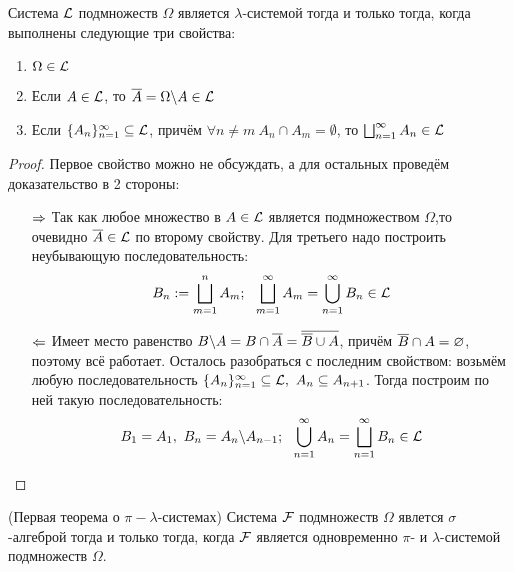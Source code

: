 \begin{proposition}
	Система $\mathcal{L}$ подмножеств $\Omega$ является $\lambda$-системой тогда и только тогда, когда выполнены следующие три свойства:
	\begin{enumerate}
		\item $\Omega \in \mathcal{L}$
		
		\item Если $A \in \mathcal{L}$, то $\overline{A} = \Omega \backslash A \in \mathcal{L}$
		
		\item Если $\{A_n\}_{n = 1}^\infty \subseteq \mathcal{L}$, причём $\forall n \neq m\ A_n \cap A_m = \emptyset$, то $\bigsqcup_{n = 1}^\infty A_n \in \mathcal{L}$
	\end{enumerate}
\end{proposition}

\begin{proof}
	Первое свойство можно не обсуждать, а для остальных проведём доказательство в 2 стороны:
	\begin{itemize}
		\item[$\Rightarrow$] Так как любое множество в $A \in \mathcal{L}$ является подмножеством $\Omega$,то очевидно $\overline{A} \in \mathcal{L}$ по второму свойству. Для третьего надо построить неубывающую последовательность:
		\[
			B_n := \bigsqcup_{m = 1}^n A_m;\ \ \bigsqcup_{m = 1}^\infty A_m = \bigcup_{n = 1}^\infty B_n \in \mathcal{L}
		\]
		
		\item[$\Leftarrow$] Имеет место равенство $B \backslash A = B \cap \overline{A} = \overline{\overline{B} \cup A}$, причём $\overline{B} \cap A = \varnothing$, поэтому всё работает. Осталось разобраться с последним свойством: возьмём любую последовательность $\{A_n\}_{n = 1}^\infty \subseteq \mathcal{L},\ A_n \subseteq A_{n + 1}$. Тогда построим по ней такую последовательность:
		\[
			B_1 = A_1,\ B_n = A_n \backslash A_{n - 1};\ \ \bigcup_{n = 1}^\infty A_n = \bigsqcup_{n = 1}^\infty B_n \in \mathcal{L}
		\]
	\end{itemize}
\end{proof}

\begin{theorem} (Первая теорема о $\pi-\lambda$-системах)
	Система $\mathcal{F}$ подмножеств $\Omega$ явлется $\sigma$-алгеброй тогда и только тогда, когда $\mathcal{F}$ является одновременно $\pi$- и $\lambda$-системой подмножеств $\Omega$.
\end{theorem}

